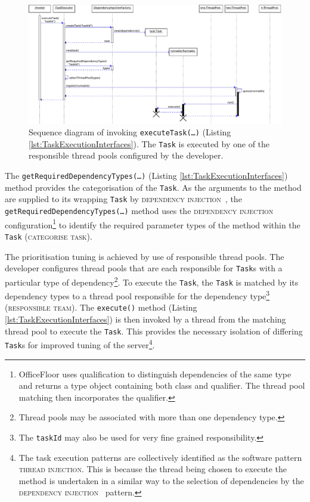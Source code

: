 \documentclass[prodmode]{style/acmlarge}
\begin{document}
\begin{figure}[!t]
\centering
\includegraphics[width=6in]{ExecuteComponentSequenceDiagram}
\caption{Sequence diagram of invoking \texttt{executeTask(\ldots)} (Listing \ref{lst:TaskExecutionInterfaces}).  The \texttt{Task} is executed by one of the responsible thread pools configured by the developer.}
\label{fig:ExecuteComponentSequenceDiagram}
\end{figure}

The \texttt{getRequiredDependencyTypes(\ldots)} (Listing
\ref{lst:TaskExecutionInterfaces}) method provides the categorisation of the
\texttt{Task}.  As the arguments to the method are supplied to its wrapping
\texttt{Task} by \textsc{dependency injection}~\cite{ioc}, the
\texttt{getRequiredDependencyTypes(\ldots)} method uses the \textsc{dependency
injection} configuration\footnote{OfficeFloor uses qualification to distinguish
dependencies of the same type and returns a type object containing both class
and qualifier.  The thread pool matching then incorporates the qualifier.} to
identify the required parameter types of the method within the \texttt{Task}
(\textsc{categorise task}).

The prioritisation tuning is achieved by use of responsible thread pools.  The
developer configures thread pools that are each responsible for \texttt{Task}s
with a particular type of dependency\footnote{Thread pools may be associated
with more than one dependency type.}.  To execute the \texttt{Task}, the
\texttt{Task} is matched by its dependency types to a thread pool responsible
for the dependency type\footnote{The \texttt{taskId} may also be used for very
fine grained responsibility.} (\textsc{responsible team}).  The
\texttt{execute()} method (Listing \ref{lst:TaskExecutionInterfaces}) is then
invoked by a thread from the matching thread pool to execute the \texttt{Task}.
This provides the necessary isolation of differing \texttt{Task}s for improved
tuning of the server\footnote{The task execution patterns are collectively
identified as the software pattern \textsc{thread injection}.  This is because
the thread being chosen to execute the method is undertaken in a similar way to
the selection of dependencies by the \textsc{dependency injection}~\cite{ioc}
pattern.}.
\end{document}
